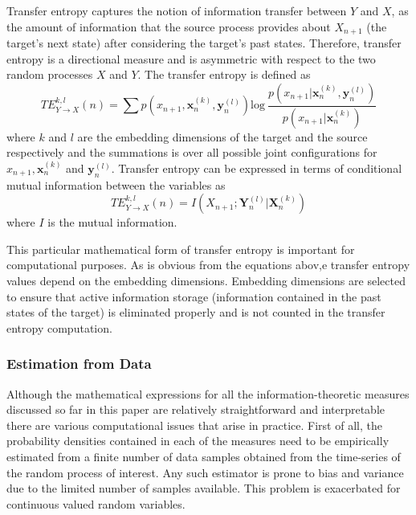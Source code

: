 \documentclass[12pt]{article}
\begin{document}
 Transfer entropy captures the notion of information transfer between $Y$ and $X$, as the amount of information that the source process provides about $X_{n+1}$ (the target's next state) after considering the target's past states. Therefore, transfer entropy is a directional measure and is asymmetric with respect to the two random processes $X$ and $Y$. The transfer entropy is defined as 
\begin{equation*}
TE_{Y \rightarrow X}^{k, l}(n) = \sum_{}^{}p(x_{n+1}, \boldsymbol{x}_n^{(k)}, \boldsymbol{y}_n^{(l)})\text{log}~\frac{p(x_{n+1} | \boldsymbol{x}_n^{(k)}, \boldsymbol{y}_n^{(l)})}{p(x_{n+1}|\boldsymbol{x}_n^{(k)})}
\end{equation*}
where $k$ and $l$ are the embedding dimensions of the target and the source respectively and the summations is over all possible joint configurations for $x_{n+1}, \boldsymbol{x}_n^{(k)}$ and $\boldsymbol{y}_n^{(l)}$. 
Transfer entropy can be expressed in terms of conditional mutual information between the variables as
\begin{equation}\label{eq:te}
TE_{Y \rightarrow X}^{k,l}(n) = I(X_{n+1}; \boldsymbol{Y}_n^{(l)}|\boldsymbol{X}_n^{(k)})
\end{equation}
where $I$ is the mutual information. 

This particular mathematical form of transfer entropy is important for computational purposes. As is obvious from the equations abov,e transfer entropy values depend on the embedding dimensions. Embedding dimensions are selected to ensure that active information storage (information contained in the past states of the target) is eliminated properly and is not counted in the transfer entropy computation. 

\subsubsection{Estimation from Data}

Although the mathematical expressions for all the information-theoretic measures discussed so far in this paper are relatively straightforward and interpretable there are various computational issues that arise in practice. First of all, the probability densities contained in each of the measures need to be empirically estimated from a finite number of data samples obtained from the time-series of the random process of interest. Any such estimator is prone to bias and variance due to the limited number of samples available. This problem is exacerbated for continuous valued random variables.
\end{document}
